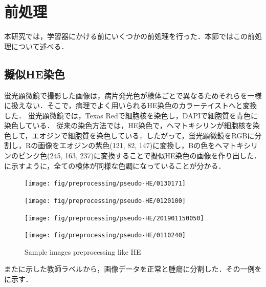 \section{前処理}
本研究では，学習器にかける前にいくつかの前処理を行った．本節ではこの前処理について述べる．

\subsection{擬似HE染色}
蛍光顕微鏡で撮影した画像は，病片発光色が検体ごとで異なるためそれらを一様に扱えない．そこで，病理でよく用いられるHE染色のカラーテイストへと変換した．
蛍光顕微鏡では，Texas Redで細胞核を染色し，DAPIで細胞質を青色に染色している．
従来の染色方法では，HE染色で，ヘマトキシリンが細胞核を染色して，エオジンで細胞質を染色している．したがって，蛍光顕微鏡をRGBに分割し，Rの画像をエオジンの紫色(121, 82, 147)に変換し，Bの色をヘマトキシリンのピンク色(245, 163, 237)に変換することで擬似HE染色の画像を作り出した．に示すように，全ての検体が同様な色調になっていることが分かる．

\begin{figure}[H]
	\centering
	
	\begin{minipage}{0.8\columnwidth}
		\centering
		\texttt{[image: fig/preprocessing/pseudo-HE/0130171]}
	\end{minipage}
	\begin{minipage}{0.8\columnwidth}
		\centering
		\texttt{[image: fig/preprocessing/pseudo-HE/0120100]}
	\end{minipage}
	\begin{minipage}{0.8\columnwidth}
		\centering
		\texttt{[image: fig/preprocessing/pseudo-HE/201901150050]}
	\end{minipage}
	\begin{minipage}{0.8\columnwidth}
		\centering
		\texttt{[image: fig/preprocessing/pseudo-HE/0110240]}
	\end{minipage}
	
	\caption{Sample images preprocessing like HE}
	\label{fig:HElike}
	
\end{figure}


またに示した教師ラベルから，画像データを正常と腫瘍に分割した．その一例をに示す．

